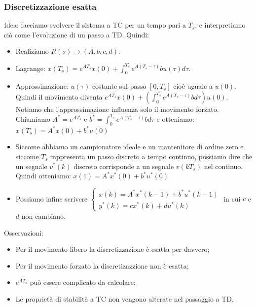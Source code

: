     \subsubsection{Discretizzazione esatta}
    Idea: facciamo evolvere il sistema a TC per un tempo pari a $T_s$, e interpretiamo ciò come l'evoluzione di un passo a TD.\newline
    Quindi:
    \begin{itemize}
        \item Realiziamo $R(s) \rightarrow (A,b,c,d)$.
        \item Lagrange: $x(T_s) = e^{AT_s} x(0) + \int_{0}^{T_s} e^{A(T_s-\tau)} b u(\tau) d \tau$.
        \item Approssimazione: $u(\tau)$ costante sul passo $[0, T_s]$ cioè uguale a $u(0)$. Quindi il movimento diventa $e^{AT_s} x(0) + \left(\int_{0}^{T_s} e^{A(T_s-\tau)} b d \tau\right) u(0)$. Notiamo che l'approssimazione influenza solo il movimento forzato. Chiamiamo $A^* = e^{AT_s}$ e $b^* = \int_{0}^{T_s} e^{A(T_s-\tau)} b d \tau$ e otteniamo:\newline
        $x(T_s) = A^* x(0) + b^* u(0)$
        \item Siccome abbiamo un campionatore ideale e un mantenitore di ordine zero e siccome $T_s$ rappresenta un passo discreto a tempo continuo, possiamo dire che un segnale $v^*(k)$ discreto corrisponde a un segnale $v(kT_s)$ nel continuo. Quindi otteniamo:\newline
        $x(1) = A^* x^*(0) + b^* u^*(0)$
        \item Possiamo infine scrivere $\begin{cases}
            x(k) = A^* x^*(k-1) + b^* u^*(k-1)\\
            y^*(k) = c x^*(k) + d u^*(k)
        \end{cases}$ in cui $c$ e $d$ non cambiano.
    \end{itemize}
    Osservazioni:
    \begin{itemize}
        \item Per il movimento libero la discretizzazione è esatta per davvero;
        \item Per il movimento forzato la discretizazzione non è esatta;
        \item $e^{AT_s}$ può essere complicato da calcolare;
        \item Le proprietà di stabilità a TC non vengono alterate nel passaggio a TD.
    \end{itemize}
